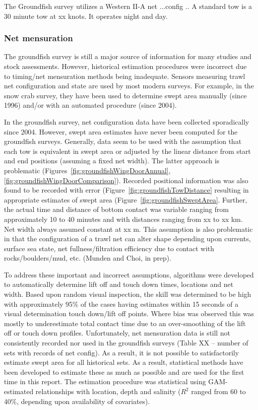 \documentclass[letterpaper,portrait,11pt]{scrartcl}
\numberwithin{equation}{section}		%
\numberwithin{figure}{section}			%
\numberwithin{table}{section}				%
\begin{document}
The Groundfish survey utilizes a Western II-A net ...config ..
A standard tow is a 30 minute tow at xx knots.
It operates night and day.


\subsubsection{Net mensuration} 

The groundfish survey is still a major source of information for many studies and stock assessments. However, historical estimation procedures were incorrect due to timing/net mensuration methods being inadequate. Sensors measuring trawl net configuration and state are used by most modern surveys. For example, in the snow crab survey, they have been used to determine swept area manually (since 1996) and/or with an automated procedure (since 2004).

In the groundfish survey, net configuration data have been collected sporadically since 2004. However, swept area estimates have never been computed for the groundfish surveys. Generally, data seem to be used with the assumption that each tow is equivalent in swept area or adjusted by the linear distance from start and end positions (assuming a fixed net width). The latter approach is problematic (Figures~\ref{fig:groundfishWingDoorAnnual}, \ref{fig:groundfishWingDoorComparison}). Recorded positional information was also found to be recorded with error (Figure~\ref{fig:groundfishTowDistance} resulting in appropriate estimates of swept area (Figure~\ref{fig:groundfishSweptArea}. Further, the actual time and distance of bottom contact was variable ranging from approximately 10 to 40 minutes and with distances ranging from xx to xx km. Net width always assumed constant at xx m. This assumption is also problematic in that the configuration of a trawl net can alter shape depending upon currents, surface sea state, net fullness/filtration efficiency due to contact with rocks/boulders/mud, etc. (Munden and Choi, in prep). 

To address these important and incorrect assumptions, algorithms were developed to automatically determine lift off and touch down times, locations and net width. Based upon random visual inspection, the skill was determined to be high with approximately 95\% of the cases having estimates within 15 seconds of a visual determination touch down/lift off points. Where bias was observed this was mostly to underestimate total contact time due to an over-smoothing of the lift off or touch down profiles. Unfortunately, net mensuration data is still not consistently recorded nor used in the groundfish surveys (Table XX -- number of sets with records of net config). As a result, it is not possible to satisfactorily estimate swept area for all historical sets. As a result, statistical methods have been developed to estimate these as much as possible and are used for the first time in this report. The estimation procedure was statistical using GAM-estimated relationships with location, depth and salinity ($R^2$ ranged from 60 to 40\%, depending upon availability of covariates). 
\end{document}
